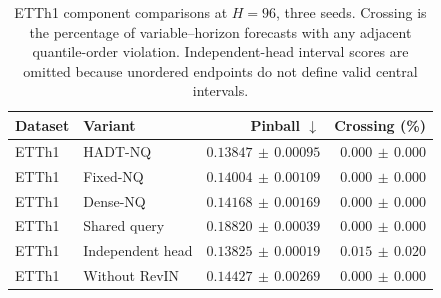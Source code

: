 \begin{table}[t]
\caption{ETTh1 component comparisons at $H=96$, three seeds. Crossing is the percentage of variable--horizon forecasts with any adjacent quantile-order violation. Independent-head interval scores are omitted because unordered endpoints do not define valid central intervals.}
\label{tab:ablation}
\centering
\small
\begin{tabular}{@{}llrr@{}}
\toprule
Dataset & Variant & Pinball $\downarrow$ & Crossing (\%) \\
\midrule
ETTh1 & HADT-NQ & $0.13847\,\pm\,0.00095$ & $0.000\,\pm\,0.000$ \\
ETTh1 & Fixed-NQ & $0.14004\,\pm\,0.00109$ & $0.000\,\pm\,0.000$ \\
ETTh1 & Dense-NQ & $0.14168\,\pm\,0.00169$ & $0.000\,\pm\,0.000$ \\
ETTh1 & Shared query & $0.18820\,\pm\,0.00039$ & $0.000\,\pm\,0.000$ \\
ETTh1 & Independent head & $0.13825\,\pm\,0.00019$ & $0.015\,\pm\,0.020$ \\
ETTh1 & Without RevIN & $0.14427\,\pm\,0.00269$ & $0.000\,\pm\,0.000$ \\
\bottomrule
\end{tabular}
\end{table}
